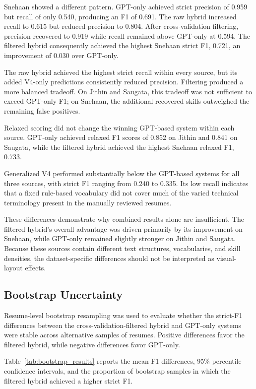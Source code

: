\documentclass[conference]{IEEEtran}
\begin{document}
Snehaan showed a different pattern. GPT-only achieved strict precision
of 0.959 but recall of only 0.540, producing an F1 of 0.691. The raw
hybrid increased recall to 0.615 but reduced precision to 0.804. After
cross-validation filtering, precision recovered to 0.919 while recall
remained above GPT-only at 0.594. The filtered hybrid consequently
achieved the highest Snehaan strict F1, 0.721, an improvement of 0.030
over GPT-only.

The raw hybrid achieved the highest strict recall within every source,
but its added V4-only predictions consistently reduced precision.
Filtering produced a more balanced tradeoff. On Jithin and Saugata, this
tradeoff was not sufficient to exceed GPT-only F1; on Snehaan, the
additional recovered skills outweighed the remaining false positives.

Relaxed scoring did not change the winning GPT-based system within each
source. GPT-only achieved relaxed F1 scores of 0.852 on Jithin and 0.841
on Saugata, while the filtered hybrid achieved the highest Snehaan
relaxed F1, 0.733.

Generalized V4 performed substantially below the GPT-based systems for
all three sources, with strict F1 ranging from 0.240 to 0.335. Its low
recall indicates that a fixed rule-based vocabulary did not cover much
of the varied technical terminology present in the manually reviewed
resumes.

These differences demonstrate why combined results alone are
insufficient. The filtered hybrid's overall advantage was driven
primarily by its improvement on Snehaan, while GPT-only remained
slightly stronger on Jithin and Saugata. Because these sources contain
different text structures, vocabularies, and skill densities, the
dataset-specific differences should not be interpreted as visual-layout
effects.

\subsection{Bootstrap Uncertainty}

Resume-level bootstrap resampling was used to evaluate whether the
strict-F1 differences between the cross-validation-filtered hybrid and
GPT-only systems were stable across alternative samples of resumes.
Positive differences favor the filtered hybrid, while negative
differences favor GPT-only.

Table~\ref{tab:bootstrap_results} reports the mean F1 differences,
95\% percentile confidence intervals, and the proportion of bootstrap
samples in which the filtered hybrid achieved a higher strict F1.
\end{document}

